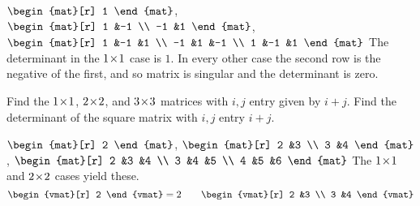 \begin{exercises}
\begin{answer}
\begin{exparts}
        \partsitem 
          $\begin{mat}[r]
            1
          \end{mat}$,
          $\begin{mat}[r]
            1  &-1  \\
            -1  &1
          \end{mat}$,
          $\begin{mat}[r]
            1   &-1  &1   \\
            -1  &1   &-1  \\
            1   &-1  &1
          \end{mat}$
        \partsitem The determinant in the $1 \! \times \! 1$ case is $1$.
          In every other case the second row is the negative of the first,
          and so matrix is singular and the determinant is zero. 
      \end{exparts} 
    \end{answer}
  \item 
    \begin{exparts}
      \partsitem Find the $1 \! \times \! 1$, $2 \! \times \! 2$, and $3 \! \times \! 3$ matrices
        with $i,j$ entry given by $i+j$.  
      \partsitem Find the determinant of the square matrix with 
        $i,j$ entry $i+j$.
    \end{exparts}
    \begin{answer}
      \begin{exparts}
        \partsitem 
          $\begin{mat}[r]
            2
          \end{mat}$,
          $\begin{mat}[r]
            2  &3  \\
            3  &4
          \end{mat}$,
          $\begin{mat}[r]
            2  &3  &4  \\
            3  &4  &5  \\
            4  &5  &6
          \end{mat}$
        \partsitem The $1 \! \times \! 1$ and $2 \! \times \! 2$ cases yield these.
          \begin{equation*}
            \begin{vmat}[r]
              2
            \end{vmat}
            =2
            \qquad
            \begin{vmat}[r]
              2  &3  \\
              3  &4

\end{vmat}
\end{equation*}
\end{exparts}
\end{answer}
\end{exercises}
